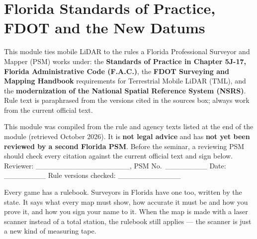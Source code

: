 \chapter{Florida Standards of Practice, FDOT and the New Datums}

This module ties mobile LiDAR to the rules a Florida Professional Surveyor and Mapper (PSM) works under: the \textbf{Standards of Practice in Chapter 5J-17, Florida Administrative Code (F.A.C.)}, the \textbf{FDOT Surveying and Mapping Handbook} requirements for Terrestrial Mobile LiDAR (TML), and the \textbf{modernization of the National Spatial Reference System (NSRS)}. Rule text is paraphrased from the versions cited in the sources box; always work from the current official text.

\begin{warning}[title={REGULATORY REVIEW REQUIRED BEFORE TEACHING}]
This module was compiled from the rule and agency texts listed at the end of the module (retrieved October 2026). It is \textbf{not legal advice} and has \textbf{not yet been reviewed by a second Florida PSM}. Before the seminar, a reviewing PSM should check every citation against the current official text and sign below.\\[4pt]
Reviewer: \_\_\_\_\_\_\_\_\_\_\_\_\_\_\_\_\_\_, PSM No.\ \_\_\_\_\_\_\_\_ \quad Date: \_\_\_\_\_\_\_\_ \quad Rule versions checked: \_\_\_\_\_\_\_\_\_\_\_\_
\end{warning}

\begin{kid}
Every game has a rulebook. Surveyors in Florida have one too, written by the state. It says what every map must show, how accurate it must be and how you prove it, and how you sign your name to it. When the map is made with a laser scanner instead of a total station, the rulebook still applies --- the scanner is just a new kind of measuring tape.
\end{kid}

